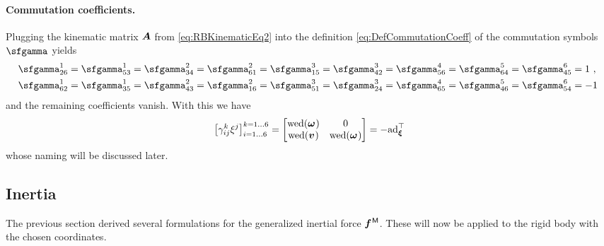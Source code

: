 \paragraph*{Commutation coefficients.}
Plugging the kinematic matrix $\boldsymbol{A}$ from \eqref{eq:RBKinematicEq2} into the definition \eqref{eq:DefCommutationCoeff} of the commutation symbols $\bodyBoltzSym{}{}{}$ yields
\begin{align}\label{eq:RBCommutationCoeff}
 \bodyBoltzSym{1}{2}{6} = \bodyBoltzSym{1}{5}{3} = 
 \bodyBoltzSym{2}{3}{4} = \bodyBoltzSym{2}{6}{1} =
 \bodyBoltzSym{3}{1}{5} = \bodyBoltzSym{3}{4}{2} =
 \bodyBoltzSym{4}{5}{6} =
 \bodyBoltzSym{5}{6}{4} = 
 \bodyBoltzSym{6}{4}{5} &= 1 \ ,
\nonumber\\
 \bodyBoltzSym{1}{6}{2} = \bodyBoltzSym{1}{3}{5} = 
 \bodyBoltzSym{2}{4}{3} = \bodyBoltzSym{2}{1}{6} =
 \bodyBoltzSym{3}{5}{1} = \bodyBoltzSym{3}{2}{4} =
 \bodyBoltzSym{4}{6}{5} =
 \bodyBoltzSym{5}{4}{6} = 
 \bodyBoltzSym{6}{5}{4} &= -1 \ 
\end{align}
and the remaining coefficients vanish.
With this we have
\begin{align}\label{eq:RBCommutationCoeffAd}
 \big[ \BoltzSym{\LidxIII}{\LidxI}{\LidxII} \sysVelCoeff{\LidxII} \big]^{\LidxIII=1\ldots6}_{\LidxI=1\ldots6} =
 \begin{bmatrix} \wedOp(\bodyAngVel{}{}) & 0 \\ \wedOp(\bodyLinVel{}{}) & \wedOp(\bodyAngVel{}{}) \end{bmatrix}
 = -\ad{\sysVel}^\top
\end{align}
whose naming will be discussed later.


\subsection{Inertia}
The previous section derived several formulations for the generalized inertial force $\bodyGenForceInertia{}{}$.
These will now be applied to the rigid body with the chosen coordinates.

